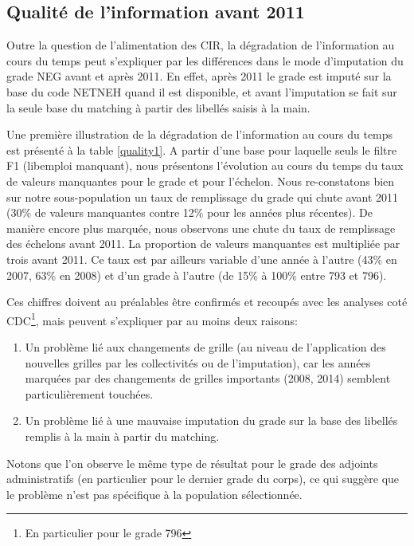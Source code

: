 \documentclass[11pt,a4paper]{article}
\begin{document}
\subsection{Qualité de l'information avant 2011}

Outre la question de l'alimentation des CIR, la dégradation de l'information au cours du temps peut s'expliquer par les différences dans le mode d'imputation du grade NEG avant et après 2011. En effet, après 2011 le grade est imputé sur la base du code NETNEH quand il est disponible, et avant l'imputation se fait sur la seule base du matching à partir des libellés saisis à la main. 

Une première illustration de la dégradation de l'information au cours du temps est présenté à la table \ref{quality1}. A partir d'une base pour laquelle seuls le filtre F1 (libemploi manquant), nous présentons l'évolution au cours du temps du taux de valeurs manquantes pour le grade et pour l'échelon. 
Nous re-constatons bien sur notre sous-population un taux de remplissage du grade qui chute avant 2011 (30\% de valeurs manquantes contre 12\% pour les années plus récentes). De manière encore plus marquée, nous observons une chute du taux de remplissage des échelons avant 2011. La proportion de valeurs manquantes est multipliée par trois avant 2011. Ce taux est par ailleurs variable d'une année à l'autre (43\% en 2007, 63\% en 2008) et d'un grade à l'autre (de 15\% à 100\% entre 793 et 796). 

Ces chiffres doivent au préalables être confirmés et recoupés avec les analyses coté CDC\footnote{En particulier pour le grade 796}, mais peuvent s'expliquer par au moins deux raisons: 
\begin{enumerate}[leftmargin=1cm ,parsep=0cm,itemsep=0cm,topsep=0cm]
\item Un problème lié aux changements de grille (au niveau de l'application des nouvelles grilles par les collectivités ou de l'imputation), car les années marquées par des changements de grilles importants (2008, 2014) semblent particulièrement touchées. 
\item Un problème lié à une mauvaise imputation du grade sur la base des libellés remplis à la main à partir du matching. 
\end{enumerate}

Notons que l'on observe le même type de résultat pour le grade des adjoints administratifs (en particulier pour le dernier grade du corps), ce qui suggère que le problème n'est pas spécifique à la population sélectionnée.
\end{document}
